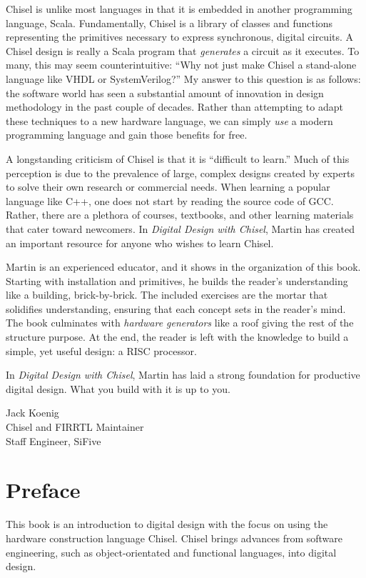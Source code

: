 \documentclass[%
    10pt,
    headinclude, footexclude,
    openright, %
    notitlepage,
    cleardoubleempty,
    headsepline,
    pointlessnumbers,
    bibtotoc, idxtotoc,
    ]{scrbook}
\begin{document}
Chisel is unlike most languages in that it is embedded in another programming language, Scala. Fundamentally, Chisel is a library of classes and functions representing the primitives necessary to express synchronous, digital circuits. A Chisel design is really a Scala program that \emph{generates} a circuit as it executes. To many, this may seem counterintuitive: ``Why not just make Chisel a stand-alone language like VHDL or SystemVerilog?'' My answer to this question is as follows: the software world has seen a substantial amount of innovation in design methodology in the past couple of decades. Rather than attempting to adapt these techniques to a new hardware language, we can simply \emph{use} a modern programming language and gain those benefits for free.

A longstanding criticism of Chisel is that it is ``difficult to learn.'' Much of this perception is due to the prevalence of large, complex designs created by experts to solve their own research or commercial needs. When learning a popular language like C++, one does not start by reading the source code of GCC. Rather, there are a plethora of courses, textbooks, and other learning materials that cater toward newcomers. In \emph{Digital Design with Chisel}, Martin has created an important resource for anyone who wishes to learn Chisel.

Martin is an experienced educator, and it shows in the organization of this book. Starting with installation and primitives, he builds the reader's understanding like a building, brick-by-brick. The included exercises are the mortar that solidifies understanding, ensuring that each concept sets in the reader's mind. The book culminates with \emph{hardware generators} like a roof giving the rest of the structure purpose. At the end, the reader is left with the knowledge to build a simple, yet useful design: a RISC processor.

In \emph{Digital Design with Chisel}, Martin has laid a strong foundation for productive digital design. What you build with it is up to you.

\medskip
\noindent Jack Koenig\\
Chisel and FIRRTL Maintainer\\
Staff Engineer, SiFive


\chapter{Preface}

This book is an introduction to digital design with the focus on using the hardware construction language Chisel. Chisel brings advances from software engineering, such as object-orientated and functional languages, into digital design.
\end{document}
